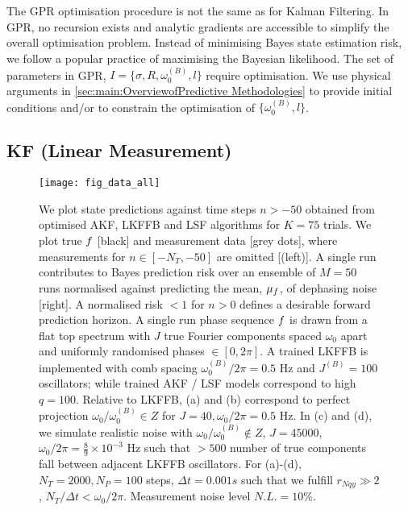 \\
\\
The GPR optimisation procedure is not the same as for Kalman Filtering. In GPR, no recursion exists and analytic gradients are accessible to simplify the overall optimisation problem. Instead of minimising Bayes state estimation risk, we follow a popular practice of maximising the Bayesian likelihood. The set of parameters in GPR, $I = \{\sigma, R, \omega_0^{(B)}, l \}$ require optimisation. We use physical arguments in \cref{sec:main:OverviewofPredictive Methodologies} to provide initial conditions and/or to constrain the optimisation of $\{ \omega_0^{(B)}, l\}$. 





\subsection{KF (Linear Measurement)}
\begin{figure}
    \texttt{[image: fig\_data\_all]}
    \caption{\label{fig:main:fig_data_all} We plot state predictions against time steps $n > -50$ obtained from optimised AKF, LKFFB and LSF algorithms for $K=75$ trials. We plot true $f$ [black] and measurement data [grey dots], where measurements for $n \in [-N_T, -50]$ are omitted [(left)]. A single run contributes to Bayes prediction risk over an ensemble of $M=50$ runs normalised against predicting the mean, $\mu_f$, of dephasing noise [right]. A normalised risk $<1$ for $n > 0$ defines a desirable forward prediction horizon. A single run phase sequence $f$ is drawn from a flat top spectrum with $J$ true Fourier components spaced $\omega_0$ apart and uniformly randomised phases $\in [0, 2\pi]$. A trained LKFFB is implemented with comb spacing $\omega_0^{(B)} / 2\pi = 0.5$ Hz and $J^{(B)} =100$ oscillators; while trained AKF / LSF models correspond to high $q = 100$. Relative to LKFFB,  (a) and (b) correspond to perfect projection $\omega_0 / \omega_0^{(B)}  \in Z $ for $J= 40, \omega_0 / 2\pi = 0.5$ Hz. In (c) and (d), we simulate realistic noise with $\omega_0 / \omega_0^{(B)}  \notin Z$, $J = 45000$, $\omega_0 / 2\pi = \frac{8}{9} \times 10^{-3}$ Hz such that $>500$ number of true components fall between adjacent LKFFB oscillators. For (a)-(d), $N_T = 2000, N_P = 100$ steps, $\Delta t = 0.001s$ such that we fulfill $r_{Nqy} \gg 2$, $N_T / \Delta t < \omega_0/2\pi$. Measurement noise level $ N.L.= 10\%$.}
\end{figure} 

